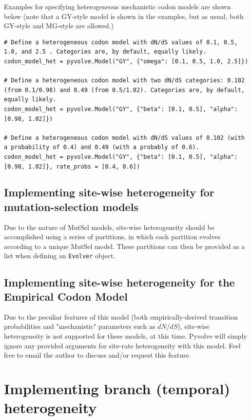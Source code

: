 \documentclass{article}
\newcommand{\code}[1]{\texttt{\small{#1}}}
\begin{document}
Examples for specifying heterogeneous mechanistic codon models are shown below (note that a GY-style model is shown in the examples, but as usual, both GY-style and MG-style are allowed.)
\begin{lstlisting}
# Define a heterogeneous codon model with dN/dS values of 0.1, 0.5, 1.0, and 2.5 . Categories are, by default, equally likely.
codon_model_het = pyvolve.Model("GY", {"omega": [0.1, 0.5, 1.0, 2.5]})

# Define a heterogeneous codon model with two dN/dS categories: 0.102 (from 0.1/0.98) and 0.49 (from 0.5/1.02). Categories are, by default, equally likely.
codon_model_het = pyvolve.Model("GY", {"beta": [0.1, 0.5], "alpha": [0.98, 1.02]})

# Define a heterogeneous codon model with dN/dS values of 0.102 (with a probability of 0.4) and 0.49 (with a probably of 0.6).
codon_model_het = pyvolve.Model("GY", {"beta": [0.1, 0.5], "alpha": [0.98, 1.02]}, rate_probs = [0.4, 0.6])
\end{lstlisting}


\subsection{Implementing site-wise heterogeneity for mutation-selection models}

Due to the nature of MutSel models, site-wise heterogeneity should be accomplished using a series of partitions, in which each partition evolves according to a unique MutSel model. These partitions can then be provided as a list when defining an \code{Evolver} object.


\subsection{Implementing site-wise heterogeneity for the Empirical Codon Model}

Due to the peculiar features of this model (both empirically-derived transition probabilities and "mechanistic" parameters such as $dN/dS$), site-wise heterogeneity is not supported for these models, at this time. Pyvolve will simply ignore any provided arguments for site-rate heterogeneity with this model. Feel free to email the author to discuss and/or request this feature.

\section{Implementing branch (temporal) heterogeneity}\label{sec:branchhet}
\end{document}
